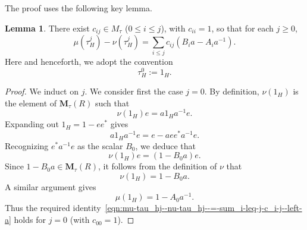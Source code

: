 \documentclass[reqno]{amsart}
\theoremstyle{plain} \newtheorem{theorem} {Theorem} \newtheorem{conjecture} {Conjecture} \newtheorem{corollary} [theorem] {Corollary} \newtheorem{proposition} [theorem] {Proposition} \newtheorem{fact} [theorem] {Fact}
\theoremstyle{definition} \newtheorem{definition} [theorem] {Definition}
\theoremstyle{itplain} %
\newtheorem{lemma}[theorem]{Lemma}
\begin{document}
The proof uses the following key lemma.
\begin{lemma}\label{lemma:there-exist-c_ij-in-rtau-0-leq-i-leq-j-with-c_i-i-}
  There exist $c_{ij} \in M_\tau$ ($0 \leq i \leq j$), with $c_{i i} = 1$, so that for each $j \geq 0$,
  \begin{equation}\label{eqn:mu-tau_hj--nu-tau_hj--=-sum_i-leq-j-c_i-j--left-a}
    \mu  (\tau_H^j ) - \nu (\tau_H^j )
    = \sum_{i \leq j}
    c_{i j }  \left( B_i a - A_i a^{-1} \right).
  \end{equation}
  Here and henceforth, we adopt the convention
  \begin{equation*}
    \tau_H^0 := 1_H.
  \end{equation*}
\end{lemma}
\begin{proof}
  We induct on $j$.  We consider first the case $j = 0$.  By definition, $\nu(1_H)$ is the element of $\mathbf{M}_\tau(R)$ such that
  \begin{equation*}
    \nu(1_H) e = a 1_H a ^{-1} e.
  \end{equation*}
  Expanding out $1_H = 1 - e e^*$ gives
  \begin{equation*}
    a 1_H a^{-1} e = e - a e e^* a ^{-1} e.
  \end{equation*}
  Recognizing $e^* a^{-1} e$ as the scalar $B_0$, we deduce that
  \begin{equation*}
    \nu(1_H) e = (1 - B_0 a) e.
  \end{equation*}
  Since $1 - B_0 a \in \mathbf{M}_{\tau}(R)$, it follows from the definition of $\nu$ that
  \begin{equation*}
    \nu(1_H) = 1 - B_0 a.
  \end{equation*}
  A similar argument gives
  \begin{equation}\label{eqn:nu1_h-=-1-a_0-a-1.-}
    \mu(1_H) = 1 - A_0 a^{-1}.
  \end{equation}
  Thus the required identity~\eqref{eqn:mu-tau_hj--nu-tau_hj--=-sum_i-leq-j-c_i-j--left-a} holds for $j = 0$ (with $c_{0 0} = 1$).


\end{proof}
\end{document}
